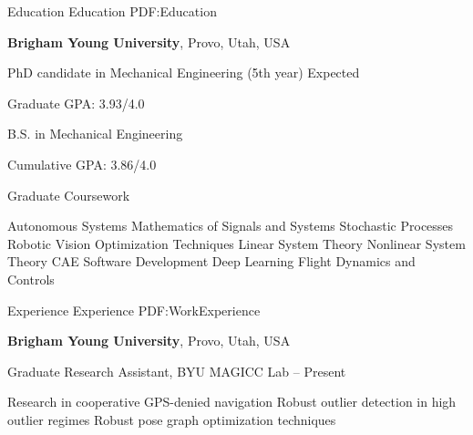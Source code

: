 \documentclass[letterpaper,MMMyyyy,nonstopmode]{simpleresumecv}
\begin{document}
\begin{Body}


\Section
{Education}
{Education}
{PDF:Education}

\Entry
{\textbf{Brigham Young University}},
Provo, Utah, USA

\Gap
\BulletItem
PhD candidate in Mechanical Engineering (5th year)
\hfill
Expected 
\begin{Detail}
\SubBulletItem
Graduate GPA: 3.93/4.0
\end{Detail}

\BulletItem
B.S. in Mechanical Engineering
\hfill
\begin{Detail}
\SubBulletItem
Cumulative GPA: 3.86/4.0
\end{Detail}

\BulletItem
Graduate Coursework
\begin{multicols}{3}
\begin{flushleft}
\begin{Detail}
\SubBulletItem
Autonomous Systems
\SubBulletItem
Mathematics of Signals and Systems
\SubBulletItem
Stochastic Processes
\SubBulletItem
Robotic Vision
\SubBulletItem
Optimization Techniques
\SubBulletItem
Linear System Theory
\SubBulletItem
Nonlinear System Theory
\SubBulletItem
CAE Software Development
\SubBulletItem
Deep Learning
\SubBulletItem
Flight Dynamics and Controls
\end{Detail}
\end{flushleft}
\end{multicols}


\Section
{Experience}
{Experience}
{PDF:WorkExperience}

\Entry
\textbf{Brigham Young University},
Provo, Utah, USA

\Gap
\BulletItem
Graduate Research Assistant, BYU MAGICC Lab
\hfill
{}--
Present
\begin{Detail}
\SubBulletItem
Research in cooperative GPS-denied navigation
\SubBulletItem
Robust outlier detection in high outlier regimes
\SubBulletItem
Robust pose graph optimization techniques
\end{Detail}


\end{Body}
\end{document}
